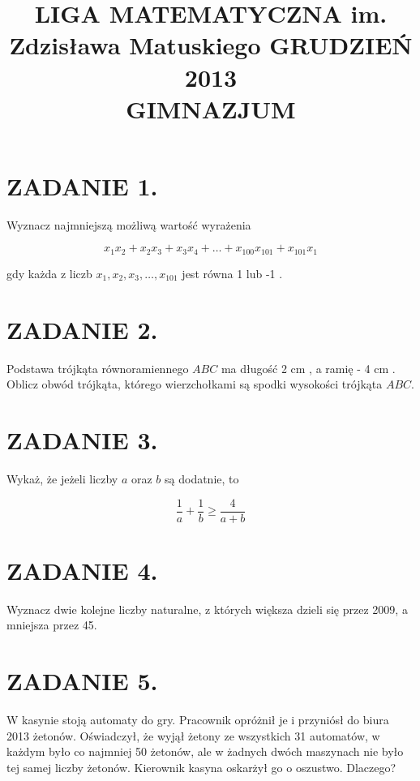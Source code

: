 \documentclass[10pt]{article}
\title{LIGA MATEMATYCZNA im. Zdzisława Matuskiego GRUDZIEŃ 2013 \\
 GIMNAZJUM }
\author{}
\date{}
\begin{document}
\maketitle
\section*{ZADANIE 1.}
Wyznacz najmniejszą możliwą wartość wyrażenia

\[
x_{1} x_{2}+x_{2} x_{3}+x_{3} x_{4}+\ldots+x_{100} x_{101}+x_{101} x_{1}
\]

gdy każda z liczb \(x_{1}, x_{2}, x_{3}, \ldots, x_{101}\) jest równa 1 lub -1 .

\section*{ZADANIE 2.}
Podstawa trójkąta równoramiennego \(A B C\) ma długość 2 cm , a ramię - 4 cm . Oblicz obwód trójkąta, którego wierzchołkami są spodki wysokości trójkąta \(A B C\).

\section*{ZADANIE 3.}
Wykaż, że jeżeli liczby \(a\) oraz \(b\) są dodatnie, to

\[
\frac{1}{a}+\frac{1}{b} \geqslant \frac{4}{a+b}
\]

\section*{ZADANIE 4.}
Wyznacz dwie kolejne liczby naturalne, z których większa dzieli się przez 2009, a mniejsza przez 45.

\section*{ZADANIE 5.}
W kasynie stoją automaty do gry. Pracownik opróżnił je i przyniósł do biura 2013 żetonów. Oświadczył, że wyjął żetony ze wszystkich 31 automatów, w każdym było co najmniej 50 żetonów, ale w żadnych dwóch maszynach nie było tej samej liczby żetonów. Kierownik kasyna oskarżył go o oszustwo. Dlaczego?
\end{document}
